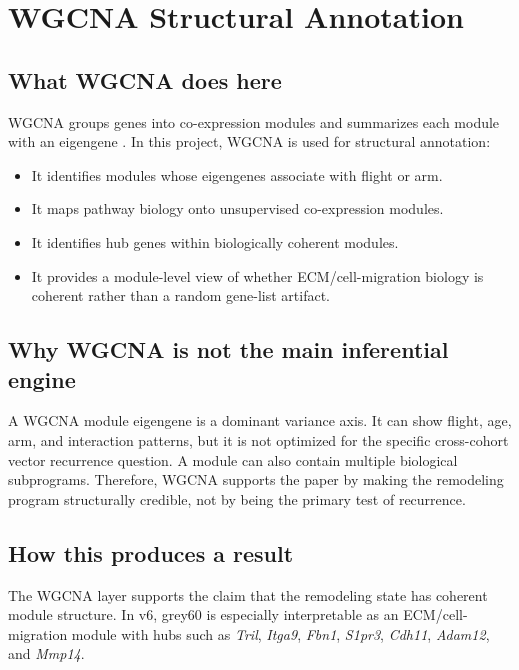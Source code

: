 \documentclass[11pt]{article}
\newcommand{\gene}[1]{\textit{#1}}
\begin{document}
\section{WGCNA Structural Annotation}

\subsection{What WGCNA does here}

WGCNA groups genes into co-expression modules and summarizes each module with an eigengene \citep{langfelder2008wgcna}. In this project, WGCNA is used for structural annotation:

\begin{itemize}
  \item It identifies modules whose eigengenes associate with flight or arm.
  \item It maps pathway biology onto unsupervised co-expression modules.
  \item It identifies hub genes within biologically coherent modules.
  \item It provides a module-level view of whether ECM/cell-migration biology is coherent rather than a random gene-list artifact.
\end{itemize}

\subsection{Why WGCNA is not the main inferential engine}

A WGCNA module eigengene is a dominant variance axis. It can show flight, age, arm, and interaction patterns, but it is not optimized for the specific cross-cohort vector recurrence question. A module can also contain multiple biological subprograms. Therefore, WGCNA supports the paper by making the remodeling program structurally credible, not by being the primary test of recurrence.

\subsection{How this produces a result}

The WGCNA layer supports the claim that the remodeling state has coherent module structure. In v6, grey60 is especially interpretable as an ECM/cell-migration module with hubs such as \gene{Tril}, \gene{Itga9}, \gene{Fbn1}, \gene{S1pr3}, \gene{Cdh11}, \gene{Adam12}, and \gene{Mmp14}.
\end{document}
